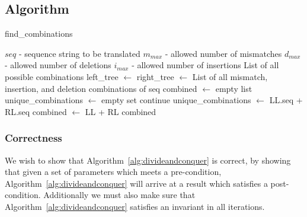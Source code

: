 \documentclass[12pt]{article}
\theoremstyle{definition}
\newcommand*\Let[2]{\State #1 $\gets$ #2}
\newcommand*\Returns[1]{\State \Return #1}
\begin{document}
\subsection{Algorithm}

\begin{spacing}{0.8}
\begin{algorithm}[H]
	\caption{find\_combinations}
	\label{alg:divideandconquer}
  	\begin{algorithmic}[1]
    		\Require
    			\Statex $seq$ - sequence string to be translated
    			\Statex $m_{max}$ - allowed number of mismatches
    			\Statex $d_{max}$ - allowed number of deletions
    			\Statex $i_{max}$ - allowed number of insertions
    		\Ensure
    			\Statex List of all possible combinations
		\Statex
    			\Let{left\_tree}{} \label{alg:divide:leftT}
    			\Let{right\_tree}{} \label{alg:divide:rightT}
    		\Else
    			\Returns{List of all mismatch, insertion, and deletion combinations of seq} \label{alg:divide:conquer}
    		\EndIf
    		\State
    		\Let{combined}{empty list}
    		\Let{unique\_combinations}{empty set}
    		 
    			 \label{alg:divide:inner} 
    				 \label{alg:divide:invariant1}
    					\State continue
    				\EndIf
    				 \label{alg:divide:invariant2}
    					\Let{unique\_combinations}{LL.seq + RL.seq}
    					\Let{combined}{LL + RL}
    				\EndIf
    			\EndFor
    		\EndFor
    		\Returns{combined}
    		\EndFunction
  	\end{algorithmic}
\end{algorithm}
\end{spacing}


\subsubsection{Correctness}

We wish to show that Algorithm~\ref{alg:divideandconquer} is correct, by showing that given a set of parameters which meets a pre-condition, Algorithm~\ref{alg:divideandconquer} will arrive at a result which satisfies a post-condition. Additionally we must also make sure that Algorithm~\ref{alg:divideandconquer} satisfies an invariant in all iterations.
\end{document}
